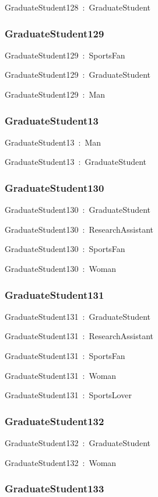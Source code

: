 \documentclass{article}
\begin{document}
GraduateStudent128~:~GraduateStudent

\subsubsection*{GraduateStudent129}

GraduateStudent129~:~SportsFan

GraduateStudent129~:~GraduateStudent

GraduateStudent129~:~Man

\subsubsection*{GraduateStudent13}

GraduateStudent13~:~Man

GraduateStudent13~:~GraduateStudent

\subsubsection*{GraduateStudent130}

GraduateStudent130~:~GraduateStudent

GraduateStudent130~:~ResearchAssistant

GraduateStudent130~:~SportsFan

GraduateStudent130~:~Woman

\subsubsection*{GraduateStudent131}

GraduateStudent131~:~GraduateStudent

GraduateStudent131~:~ResearchAssistant

GraduateStudent131~:~SportsFan

GraduateStudent131~:~Woman

GraduateStudent131~:~SportsLover

\subsubsection*{GraduateStudent132}

GraduateStudent132~:~GraduateStudent

GraduateStudent132~:~Woman

\subsubsection*{GraduateStudent133}
\end{document}
